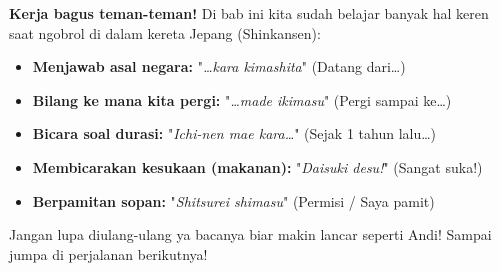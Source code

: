 \vspace{2em}
\begin{tcolorbox}[
    colback=blue!5!white,
    colframe=blue!80!black,
    boxrule=3pt,
    arc=5mm,
    title={\huge\bfseries \sffamily 🌟 Rangkuman Bab 1 🌟},
    fonttitle=\color{white},
    attach boxed title to top center={yshift=-4mm},
    boxed title style={colback=blue!80!black, rounded corners},
    left=5mm, right=5mm, top=7mm, bottom=5mm
]
\Large \textbf{Kerja bagus teman-teman!} Di bab ini kita sudah belajar banyak hal keren saat ngobrol di dalam kereta Jepang (Shinkansen):
\begin{itemize}
    \item \textbf{Menjawab asal negara:} "\textit{\dots kara kimashita}" (Datang dari\dots)
    \item \textbf{Bilang ke mana kita pergi:} "\textit{\dots made ikimasu}" (Pergi sampai ke\dots)
    \item \textbf{Bicara soal durasi:} "\textit{Ichi-nen mae kara\dots}" (Sejak 1 tahun lalu\dots)
    \item \textbf{Membicarakan kesukaan (makanan):} "\textit{Daisuki desu!}" (Sangat suka!)
    \item \textbf{Berpamitan sopan:} "\textit{Shitsurei shimasu}" (Permisi / Saya pamit)
\end{itemize}
Jangan lupa diulang-ulang ya bacanya biar makin lancar seperti Andi! Sampai jumpa di perjalanan berikutnya!
\end{tcolorbox}

\newpage
